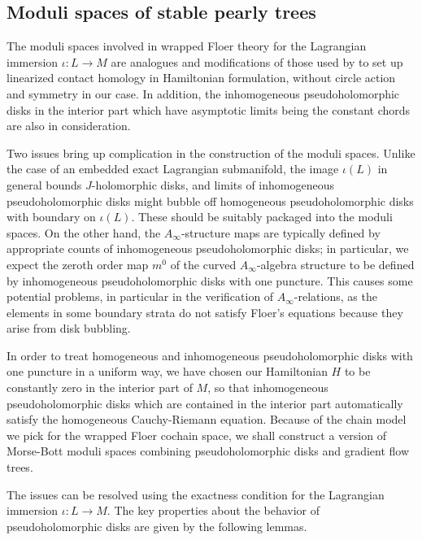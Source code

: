 \documentclass{amsart}
\numberwithin{equation}{section}
\numberwithin{figure}{section}
\begin{document}
\subsection{Moduli spaces of stable pearly trees} \label{section: moduli space of disks bounded by immersed Lagrangian submanifolds}
	The moduli spaces involved in wrapped Floer theory for the Lagrangian immersion $\iota: L \to M$ are analogues and modifications of those used by \cite{Bourgeois-Oancea} to set up linearized contact homology in Hamiltonian formulation, without circle action and symmetry in our case. In addition, the inhomogeneous pseudoholomorphic disks in the interior part which have asymptotic limits being the constant chords are also in consideration. \par
	Two issues bring up complication in the construction of the moduli spaces. Unlike the case of an embedded exact Lagrangian submanifold, the image $\iota(L)$ in general bounds $J$-holomorphic disks, and limits of inhomogeneous pseudoholomorphic disks might bubble off homogeneous pseudoholomorphic disks with boundary on $\iota(L)$. These should be suitably packaged into the moduli spaces. On the other hand, the $A_{\infty}$-structure maps are typically defined by appropriate counts of inhomogeneous pseudoholomorphic disks; in particular, we expect the zeroth order map $m^{0}$ of the curved $A_{\infty}$-algebra structure to be defined by inhomogeneous pseudoholomorphic disks with one puncture. This causes some potential problems, in particular in the verification of $A_{\infty}$-relations, as the elements in some boundary strata do not satisfy Floer's equations because they arise from disk bubbling. \par
	In order to treat homogeneous and inhomogeneous pseudoholomorphic disks with one puncture in a uniform way, we have chosen our Hamiltonian $H$ to be constantly zero in the interior part of $M$, so that inhomogeneous pseudoholomorphic disks which are contained in the interior part automatically satisfy the homogeneous Cauchy-Riemann equation. Because of the chain model we pick for the wrapped Floer cochain space, we shall construct a version of Morse-Bott moduli spaces combining pseudoholomorphic disks and gradient flow trees. \par
	The issues can be resolved using the exactness condition for the Lagrangian immersion $\iota: L \to M$. The key properties about the behavior of pseudoholomorphic disks are given by the following lemmas. \par
\end{document}
